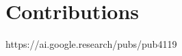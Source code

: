 \documentclass[twoside,twocolumn]{article}
\begin{document}

\section{Contributions}




\begin{thebibliography}{99} %


https://ai.google.research/pubs/pub4119

\end{thebibliography}

\end{document}
